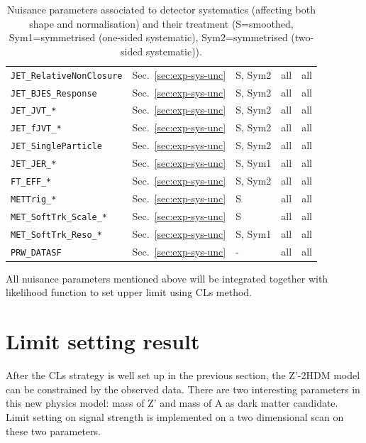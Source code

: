 \begin{table}[ht]
\begin{tabular}{|p{3.5cm}|p{2.0cm}|p{1.5cm}|p{2cm}|p{1.5cm}|}
        \texttt{JET\_RelativeNonClosure} & Sec.~\ref{sec:exp-sys-unc} & S, Sym2 & all & all \\
        \texttt{JET\_BJES\_Response} & Sec.~\ref{sec:exp-sys-unc} & S, Sym2 & all & all \\
        \texttt{JET\_JVT\_*} & Sec.~\ref{sec:exp-sys-unc} & S, Sym2 & all & all \\
        \texttt{JET\_fJVT\_*} & Sec.~\ref{sec:exp-sys-unc} & S, Sym2 & all & all \\
        \texttt{JET\_SingleParticle} & Sec.~\ref{sec:exp-sys-unc} & S, Sym2 & all & all \\
        \texttt{JET\_JER\_*} & Sec.~\ref{sec:exp-sys-unc} & S, Sym1 & all & all \\
        \texttt{FT\_EFF\_*} & Sec.~\ref{sec:exp-sys-unc} & S, Sym2 & all & all \\
        \texttt{METTrig\_*} & Sec.~\ref{sec:exp-sys-unc} & S & all & all \\
        \texttt{MET\_SoftTrk\_Scale\_*} & Sec.~\ref{sec:exp-sys-unc} & S & all & all \\
        \texttt{MET\_SoftTrk\_Reso\_*} & Sec.~\ref{sec:exp-sys-unc} & S, Sym1 & all & all \\
        \texttt{PRW\_DATASF} & Sec.~\ref{sec:exp-sys-unc} & - & all & all \\
        \hline
    \end{tabular}
    \caption{Nuisance parameters associated to detector systematics (affecting both shape and normalisation) and their treatment (S=smoothed, Sym1=symmetrised (one-sided systematic), Sym2=symmetrised (two-sided systematic)).}
    \label{tab:np-shape2}
\end{table}  

\par All nuisance parameters mentioned above will be integrated together with likelihood function to set upper limit using CLs method.

\section{Limit setting result}
\label{sec:limitres}

\par After the CLs strategy is well set up in the previous section, the Z'-2HDM model can be constrained by the observed data. 
There are two interesting parameters in this new physics model: mass of Z' and mass of A as dark matter candidate. 
Limit setting on signal strength is implemented on a two dimensional scan on these two parameters.

